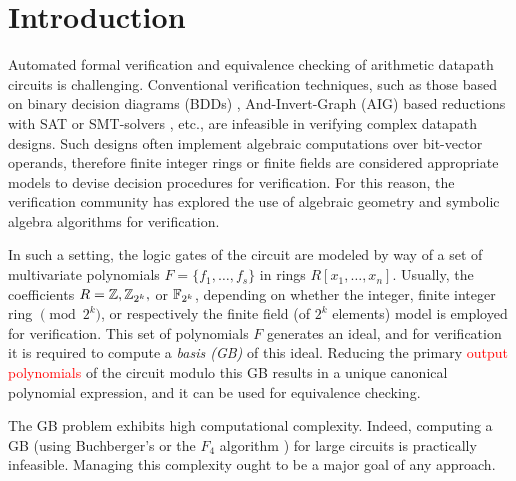 \section{Introduction}

Automated formal verification and equivalence checking of arithmetic
datapath circuits is challenging. Conventional verification
techniques, such as those based on binary  decision diagrams (BDDs)
\cite{BRYA86}, And-Invert-Graph (AIG) based reductions with SAT or
SMT-solvers \cite{alanmi:cec:iccad2006}, etc., are infeasible in
verifying complex datapath designs. Such designs often implement
algebraic computations over bit-vector operands, therefore finite
integer rings \cite{wienand:cav08} \cite{wedler:date11} or finite
fields \cite{lv:tcad2013} \cite{pruss:tcad}
are considered appropriate models to devise decision
procedures for verification. For this reason, the verification
community has explored the use of algebraic geometry and symbolic
algebra algorithms for verification. 


In such a setting, the logic gates of the circuit are modeled by way
of a set of multivariate polynomials $F=\{f_1,\dots,f_s\}$ in rings
$R[x_1,\dots,x_n]$. Usually, the coefficients $R = {\mathbb{Z}}, {\mathbb{Z}}_{2^k},$ or ${\mathbb{F}}_{2^k}$,
depending on whether the integer, finite integer ring
$\pmod{2^k}$, or respectively the finite field (of $2^k$ elements)
model is employed for verification. This set of polynomials $F$
generates an ideal, and for verification it is required to compute a
{\it \Grobner basis (GB)} \cite{gb_book} of this ideal. Reducing the
primary \textcolor{red}{output polynomials} of the circuit modulo this
GB  results in a unique canonical polynomial expression, and it can be
used for equivalence checking.  


The GB problem exhibits high computational complexity. 
Indeed, computing a GB (using Buchberger's \cite{buchberger_thesis} or
the $F_4$ algorithm \cite{f4}) for large circuits is practically
infeasible. Managing this complexity ought to be a major goal of any
approach. 

